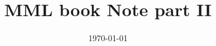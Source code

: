 \documentclass[12pt, a4paper]{book}
\begin{document}
	\title{MML book Note part II}
	\date{\today}
	\maketitle
	\tableofcontents
	\setcounter{chapter}{7}
	
\end{document}
